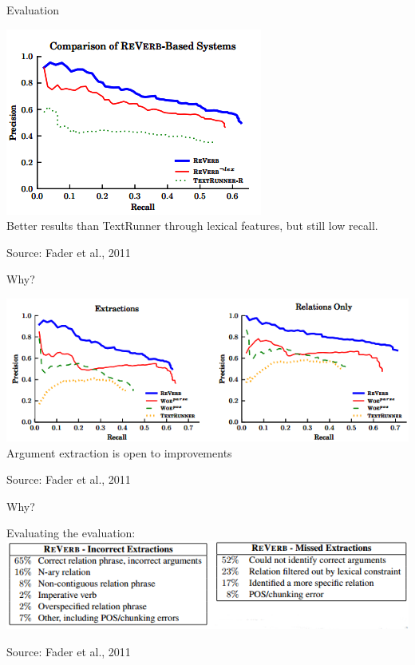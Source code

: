 \documentclass[11pt]{beamer}
\begin{document}
				\begin{frame}{Evaluation}
					\begin{center}
						
						\includegraphics[scale=0.8]{img/reverbeval.png}\\
						Better results than TextRunner through lexical features, but still low recall.\\
						\begin{scriptsize}Source: Fader et al., 2011\end{scriptsize}
					\end{center}
				\end{frame}
				\begin{frame}{Why?}
					\begin{center}
						
						\includegraphics[scale=0.7]{img/reverbeval2.png}\\
						Argument extraction is open to improvements\\
						\begin{scriptsize}Source: Fader et al., 2011\end{scriptsize}
					\end{center}
				\end{frame}
				\begin{frame}{Why?}
					\begin{center}
						Evaluating the evaluation: 
						\includegraphics[scale=0.7]{img/reverberrortypes.png}\\
						\begin{scriptsize}Source: Fader et al., 2011\end{scriptsize}
					\end{center}
				\end{frame}
\end{document}
